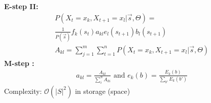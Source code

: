 \documentclass[main]{subfiles}
\begin{document}
\begin{landscape}
\begin{multicols}{4}
\textbf{E-step II:}
\begin{eqnarray}
P(X_t = x_k, X_{t+1} = x_l | \vec{s}, \Theta) = \\
 \frac{1}{P(\vec{s})} f_k(s_t) a_{kl} e_l(s_{t+1}) b_l(s_{t+1}) \\
A_{kl} = \sum\limits_{j=1}^m \sum\limits_{t=1}^n P(X_t = x_k, X_{t+1} = x_l | \vec{s}, \Theta)
\end{eqnarray}
\textbf{M-step :}
\begin{eqnarray}
a_{kl} = \frac{A_{kl}}{\sum\limits_i^n A_{ki}} \text{   and   } e_k(b) = \frac{E_k(b)}{\sum_{b'} E_k(b')}
\end{eqnarray}
Complexity: $\mathcal{O}(|S|^2)$ in storage (space)
\end{multicols}
\end{landscape}
\end{document}

